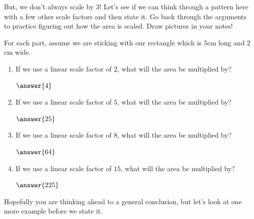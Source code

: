 \documentclass{ximera}
\begin{document}
But, we don't always scale by $3$! Let's see if we can think through a pattern here with a few other scale factors and then state it. Go back through the arguments to practice figuring out how the area is scaled. Draw pictures in your notes!
\begin{question}
For each part, assume we are sticking with our rectangle which is $5$cm long and $2$cm wide.
\begin{enumerate}
\item If we use a linear scale factor of $2$, what will the area be multiplied by? \begin{prompt} $\answer{4}$\end{prompt}
\item If we use a linear scale factor of $5$, what will the area be multiplied by? \begin{prompt} $\answer{25}$\end{prompt}
\item If we use a linear scale factor of $8$, what will the area be multiplied by? \begin{prompt} $\answer{64}$\end{prompt}
\item If we use a linear scale factor of $15$, what will the area be multiplied by? \begin{prompt} $\answer{225}$\end{prompt}
\end{enumerate}
\end{question}

Hopefully you are thinking ahead to a general conclusion, but let's look at one more example before we state it.
\end{document}

